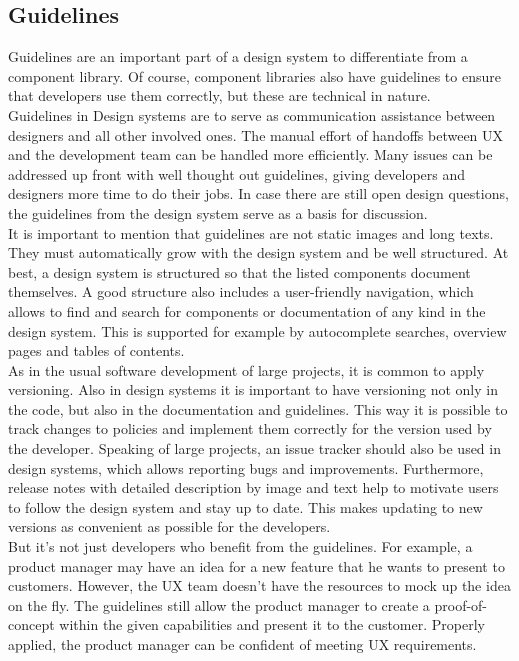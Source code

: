 \subsection{Guidelines}
Guidelines are an important part of a design system to differentiate from a component library. Of course, component libraries also have guidelines to ensure that developers use them correctly, but these are technical in nature.  \\
Guidelines in Design systems are to serve as communication assistance between designers and all other involved ones. The manual effort of handoffs between UX and the development team can be handled more efficiently. Many issues can be addressed up front with well thought out guidelines, giving developers and designers more time to do their jobs. In case there are still open design questions, the guidelines from the design system serve as a basis for discussion. \cite{vesselov_building_2019} \\
It is important to mention that guidelines are not static images and long texts. They must automatically grow with the design system and be well structured. At best, a design system is structured so that the listed components document themselves. A good structure also includes a user-friendly navigation, which allows to find and search for components or documentation of any kind in the design system. This is supported for example by autocomplete searches, overview pages and tables of contents.  \cite{macdonald_practical_2019}\cite{vesselov_building_2019} \\
As in the usual software development of large projects, it is common to apply versioning. Also in design systems it is important to have versioning not only in the code, but also in the documentation and guidelines. This way it is possible to track changes to policies and implement them correctly for the version used by the developer. Speaking of large projects, an issue tracker should also be used in design systems, which allows reporting bugs and improvements. Furthermore, release notes with detailed description by image and text help to motivate users to follow the design system and stay up to date. This makes updating to new versions as convenient as possible for the developers. \cite{macdonald_practical_2019} \\
But it's not just developers who benefit from the guidelines. For example, a product manager may have an idea for a new feature that he wants to present to customers. However, the UX team doesn't have the resources to mock up the idea on the fly. The guidelines still allow the product manager to create a proof-of-concept within the given capabilities and present it to the customer. Properly applied, the product manager can be confident of meeting UX requirements.  \cite{vesselov_building_2019} \\
